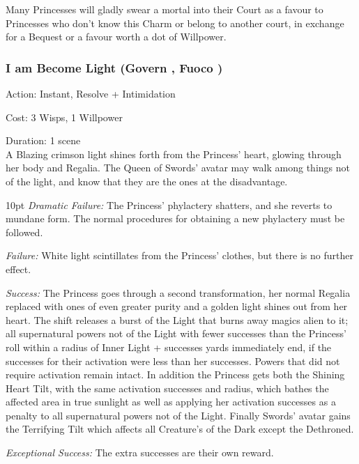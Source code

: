 Many Princesses will gladly swear a mortal into their Court as a favour to Princesses who don't know this Charm or belong to another court, in exchange for a Bequest or a favour worth a dot of Willpower. 

\subsubsection*{I am Become Light (Govern \textbullet\textbullet\textbullet\textbullet\textbullet, Fuoco \textbullet\textbullet\textbullet\textbullet)}

\noindent Action: Instant, Resolve + Intimidation

\noindent Cost: 3 Wisps, 1 Willpower

\noindent Duration: 1 scene \\

\noindent A Blazing crimson light shines forth from the Princess' heart, glowing through her body and Regalia. The Queen of Swords' avatar may walk among things not of the light, and know that they are the ones at the disadvantage.

   \begin{myindentpar}{10pt} \emph{Dramatic Failure:} The Princess' phylactery shatters, and she reverts to mundane form. The normal procedures for obtaining a new phylactery must be followed.

    \emph{Failure:} White light scintillates from the Princess' clothes, but there is no further effect.

    \emph{Success:} The Princess goes through a second transformation, her normal Regalia replaced with ones of even greater purity and a golden light shines out from her heart. The shift releases a burst of the Light that burns away magics alien to it; all supernatural powers not of the Light with fewer successes than the Princess' roll within a radius of Inner Light + successes yards immediately end, if the successes for their activation were less than her successes. Powers that did not require activation remain intact. In addition the Princess gets both the Shining Heart Tilt, with the same activation successes and radius, which bathes the affected area in true sunlight as well as applying her activation successes as a penalty to all supernatural powers not of the Light. Finally Swords' avatar gains the Terrifying Tilt which affects all Creature's of the Dark except the Dethroned.  

    \emph{Exceptional Success:} The extra successes are their own reward.\end{myindentpar} 
    
